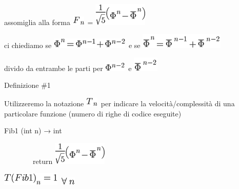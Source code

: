 \documentclass{article}
\begin{document}
{~}

{}

{assomiglia alla forma }\includegraphics{images/image1.png}{~=
}\includegraphics{images/image4.png}{~}

{ci chiediamo se }\includegraphics{images/image19.png}{~e se
}\includegraphics{images/image20.png}

{divido da entrambe le parti per
}\includegraphics{images/image21.png}{~e
}\includegraphics{images/image22.png}

{}

{Definizione \#1}

{}

{Utilizzeremo la notazione }\includegraphics{images/image23.png}{~per
indicare la velocità/complessità di una particolare funzione (numero di
righe di codice eseguite) }

{}

{Fib1 (int n) → int}

{~~~~~~~~return }\includegraphics{images/image4.png}

\includegraphics{images/image24.png}{~}\includegraphics{images/image25.png}

{}
\end{document}
